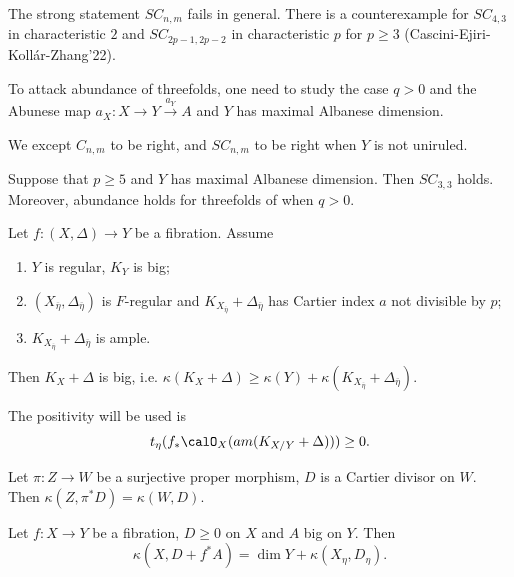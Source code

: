 \begin{remark}
	The strong statement $SC_{n,m}$ fails in general.
	There is a counterexample for $SC_{4,3}$ in characteristic $2$ and $SC_{2p-1,2p-2}$ in characteristic $p$ for $p \geq 3$ (Cascini-Ejiri-Kollár-Zhang'22).
\end{remark}

\begin{remark}
	To attack abundance of threefolds, one need to study the case $q > 0$ and the Abunese map $a_X: X \to Y \xrightarrow{a_Y} A$ and $Y$ has maximal Albanese dimension.
\end{remark}

We except $C_{n,m}$ to be right, and $SC_{n,m}$ to be right when $Y$ is not uniruled.

\begin{theorem}[Zhang'20]
	Suppose that $p \geq 5$ and $Y$ has maximal Albanese dimension.
	Then $SC_{3,3}$ holds.
	Moreover, abundance holds for threefolds of when $q > 0$.
\end{theorem}

\begin{theorem}\label{thm:positivity4-application}
	Let $f: (X, \Delta) \to Y$ be a fibration.
	Assume
	\begin{enumerate}
		\item $Y$ is regular, $K_Y$ is big;
		\item $(X_{\overline{\eta}}, \Delta_{\overline{\eta}})$ is $F$-regular and $K_{X_{\overline{\eta}}} + \Delta_{\overline{\eta}}$ has Cartier index $a$ not divisible by $p$;
		\item $K_{X_{\overline{\eta}}} + \Delta_{\overline{\eta}}$ is ample.
	\end{enumerate}
	Then $K_X + \Delta$ is big, i.e. $\kappa(K_X + \Delta) \geq \kappa(Y) + \kappa(K_{X_{\overline{\eta}}} + \Delta_{\overline{\eta}})$.
\end{theorem}

The positivity will be used is
\[ t_\eta(f_* \calO_X(am(K_{X/Y} + \Delta))) \geq 0. \]

\begin{lemma}
	Let $\pi:Z \to W$ be a surjective proper morphism, $D$ is a Cartier divisor on $W$.
	Then $\kappa(Z, \pi^*D) = \kappa(W, D)$.
\end{lemma}

\begin{lemma}
	Let $f: X \to Y$ be a fibration, $D \geq 0$ on $X$ and $A$ big on $Y$.
	Then
	\[ \kappa(X, D + f^*A) = \dim Y + \kappa(X_\eta, D_\eta). \]
\end{lemma}

